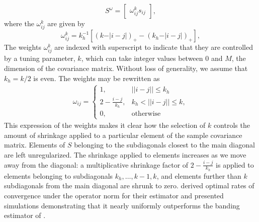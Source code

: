 \begin{equation} \label{eq:cai-tapering-estimator}
S^{\omega} =  \begin{bmatrix} \omega_{ij}^k s_{ij} \end{bmatrix},
\end{equation}
\noindent
where the $\omega_{ij}^k$ are given by 
\begin{equation*}
\omega^k_{ij} = k_h^{-1} \left[ \left( k - \vert i-j\vert\right)_+ - \left(k_h - \vert i-j\vert\right)_+ \right],
\end{equation*}
\noindent
The weights $\omega^k_{ij}$ are indexed with superscript to indicate that they  are controlled by a tuning parameter, $k$,  which can take integer values between 0 and $M$, the dimension of the covariance matrix.  Without loss of generality,  we assume that $k_h = k/2$ is even. The weights may be rewritten as
\begin{align*}
\omega_{ij} = \left\{\begin{array}{ll} 1, & \vert \vert i -j \vert \vert \le k_h \\
                             2 - \frac{i - j}{k_h}, & k_h < \vert \vert i -j \vert \vert \le k, \\
                             0, & \mbox{otherwise}  \end{array} \right.
\end{align*}
\noindent
This expression of the weights makes it clear how the selection of $k$ controls the amount of shrinkage applied to a particular element of the sample covariance matrix. Elements of $S$ belonging to the subdiagonals closest to the main diagonal are left unregularized. The shrinkage applied to elements increases as we move away from the diagonal: a multiplicative shrinkage factor of $2 - \frac{i - j}{k_h}$ is applied to elements belonging to subdiagonals $k_h,\dots,k-1,k$, and elements further than $k$ subdiagonals from the main diagonal are shrunk to zero. \cite{cai2010optimal} derived optimal rates of convergence under the operator norm for their estimator and presented simulations demonstrating that it nearly uniformly outperforms the banding estimator of \cite{bickel2008regularized}.  


\bigskip


